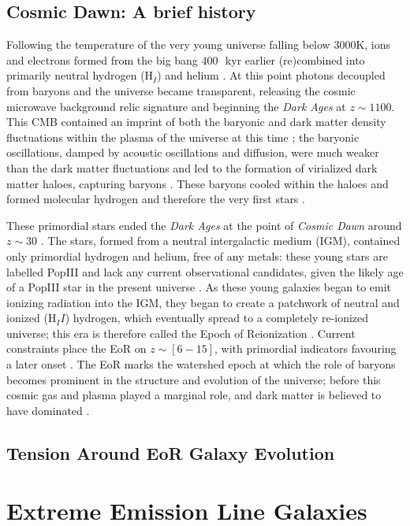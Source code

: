 \documentclass[fleqn,usenatbib]{mnras}
\begin{document}
\subsection{Cosmic Dawn: A brief history}
Following the temperature of the very young universe falling below 3000K, ions and electrons formed from the big bang $400\,$~kyr earlier (re)combined into primarily neutral hydrogen (H$_I$) and helium \citep{Barkana_2001}. At this point photons decoupled from baryons and the universe became transparent, releasing the cosmic microwave background relic signature and beginning the \textit{Dark Ages} at $z\sim1100$. This CMB contained an imprint of both the baryonic and dark matter density fluctuations within the plasma of the universe at this time \citep{smoot_1992}; the baryonic oscillations, damped by acoustic oscillations and diffusion, were much weaker than the dark matter fluctuations and led to the formation of virialized dark matter haloes, capturing baryons \citep{tacchella_2025,Tacchella_2018}. These baryons cooled within the haloes and formed molecular hydrogen and therefore the very first stars \citep{bromm_2004}.

These primordial stars ended the \textit{Dark Ages} at the point of \textit{Cosmic Dawn} around $z\sim30$ \citep{tacchella_2025}. The stars, formed from a neutral intergalactic medium (IGM), contained only primordial hydrogen and helium, free of any metals: these young stars are labelled PopIII and lack any current observational candidates, given the likely age of a PopIII star in the present universe \citep{klessen}. As these young galaxies began to emit ionizing radiation into the IGM, they began to create a patchwork of neutral and ionized (H$_II$) hydrogen, which eventually spread to a completely re-ionized universe; this era is therefore called the Epoch of Reionization \citep{Ciardi_2005, Morales_2010}. Current constraints place the EoR on $z\sim[6-15]$, with primordial indicators favouring a later onset \citep{planck_2016}. The EoR marks the watershed epoch at which the role of baryons becomes prominent in the structure and evolution of the universe; before this cosmic gas and plasma played a marginal role, and dark matter is believed to have dominated \citep{zaroubi}.
\subsection{Tension Around EoR Galaxy Evolution}


\section{Extreme Emission Line Galaxies}
\label{sec:eelg}
\end{document}
